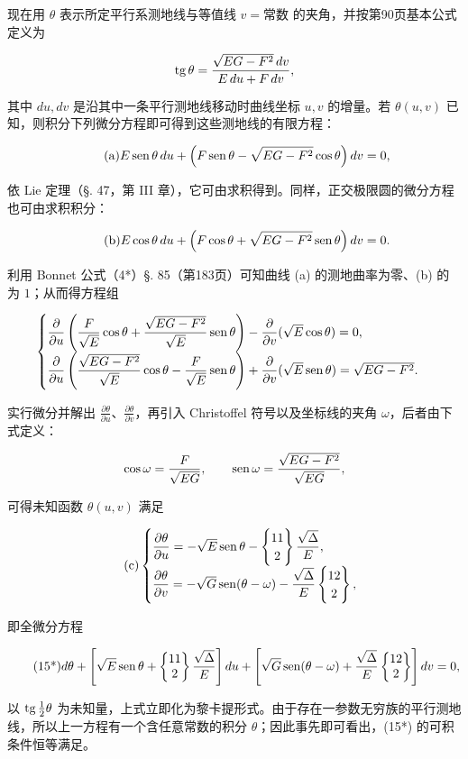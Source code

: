 现在用 $\theta$ 表示所定平行系测地线与等值线 $v=\text{常数}$ 的夹角，并按第90页基本公式定义为

\[
 \operatorname{tg}\theta=\frac{\sqrt{EG-F^2}\,dv}{E\,du+F\,dv},
\]

其中 \(du,dv\) 是沿其中一条平行测地线移动时曲线坐标 \(u,v\) 的增量。若 \(\theta(u,v)\) 已知，则积分下列微分方程即可得到这些测地线的有限方程：

\[
\tag{a}
 E\operatorname{sen}\theta\,du+\left(F\operatorname{sen}\theta-\sqrt{EG-F^2}\cos\theta\right)dv=0,
\]

依 Lie 定理（§. 47，第 III 章），它可由求积得到。同样，正交极限圆的微分方程也可由求积积分：

\[
\tag{b}
 E\cos\theta\,du+\left(F\cos\theta+\sqrt{EG-F^2}\operatorname{sen}\theta\right)dv=0.
\]

利用 Bonnet 公式（4*）§. 85（第183页）可知曲线 (a) 的测地曲率为零、(b) 的为 \(1\)；从而得方程组

\[
\begin{cases}
\dfrac{\partial}{\partial u}\left(\dfrac{F}{\sqrt E}\cos\theta+
\dfrac{\sqrt{EG-F^2}}{\sqrt E}\operatorname{sen}\theta\right)-
\dfrac{\partial}{\partial v}(\sqrt E\cos\theta)=0,\\[.8em]
\dfrac{\partial}{\partial u}\left(\dfrac{\sqrt{EG-F^2}}{\sqrt E}\cos\theta-
\dfrac{F}{\sqrt E}\operatorname{sen}\theta\right)+
\dfrac{\partial}{\partial v}(\sqrt E\operatorname{sen}\theta)=\sqrt{EG-F^2}.
\end{cases}
\]

实行微分并解出 \(\frac{\partial\theta}{\partial u}\)、\(\frac{\partial\theta}{\partial v}\)，再引入 Christoffel 符号以及坐标线的夹角 \(\omega\)，后者由下式定义：

\[
 \cos\omega=\frac{F}{\sqrt{EG}},
 \qquad
 \operatorname{sen}\omega=\frac{\sqrt{EG-F^2}}{\sqrt{EG}},
\]

可得未知函数 $\theta(u,v)$ 满足

\[
\tag{c}
\begin{cases}
\dfrac{\partial\theta}{\partial u}=-\sqrt E\operatorname{sen}\theta-
\left\{\begin{matrix}11\\2\end{matrix}\right\}\dfrac{\sqrt\Delta}{E},\\[.7em]
\dfrac{\partial\theta}{\partial v}=-\sqrt G\operatorname{sen}(\theta-\omega)-
\dfrac{\sqrt\Delta}{E}\left\{\begin{matrix}12\\2\end{matrix}\right\},
\end{cases}
\]

即全微分方程

\[
\tag{15*}
 d\theta+\left[\sqrt E\operatorname{sen}\theta+\left\{\begin{matrix}11\\2\end{matrix}\right\}\frac{\sqrt\Delta}{E}\right]du+
 \left[\sqrt G\operatorname{sen}(\theta-\omega)+\frac{\sqrt\Delta}{E}\left\{\begin{matrix}12\\2\end{matrix}\right\}\right]dv=0,
\]

以 $\operatorname{tg}\frac12\theta$ 为未知量，上式立即化为黎卡提形式。由于存在一参数无穷族的平行测地线，所以上一方程有一个含任意常数的积分 $\theta$；因此事先即可看出，(15*) 的可积条件恒等满足。



